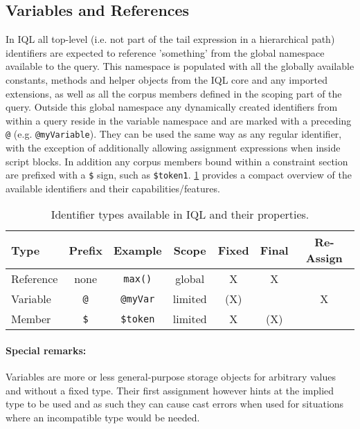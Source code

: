\documentclass[11pt,a4paper,portrait]{article}
\newcommand{\iql}{IQL\xspace}
\begin{document}
\subsection{Variables and References}
\label{sec:variables-references}

In \iql all top-level (i.e. not part of the tail expression in a hierarchical path) identifiers are expected to reference 'something' from the global namespace available to the query. This namespace is populated with all the globally available constants, methods and helper objects from the \iql core and any imported extensions, as well as all the corpus members defined in the scoping part of the query. Outside this global namespace any dynamically created identifiers from within a query reside in the variable namespace and are marked with a preceding \texttt{@} (e.g. \texttt{@myVariable}). They can be used the same way as any regular identifier, with the exception of additionally allowing assignment expressions when inside script blocks. In addition any corpus members bound within a constraint section are prefixed with a \texttt{\$} sign, such as \texttt{\$token1}. \cref{tab:identifiers} provides a compact overview of the available identifiers and their capabilities/features.

\begin{table}[ht]
	\centering\begin{tabular}{|l|c|c|c|c|c|c|}
		\hline 
		Type	& Prefix & Example & Scope & Fixed\footnotemark & Final & Re-Assign \\ 
		\hline 
		Reference	& none & \texttt{max()} & global & X & X &  \\ 
		\hline 
		Variable	& \texttt{@} & \texttt{@myVar} & limited & (X) &  & X \\ 
		\hline 
		Member	& \texttt{\$} & \texttt{\$token} & limited & X & (X) &  \\ 
		\hline 
	\end{tabular}
	\caption{Identifier types available in \iql and their properties.}
	\label{tab:identifiers}
\end{table}

\paragraph{Special remarks:}
\noindent Variables are more or less general-purpose storage objects for arbitrary values and without a fixed type. Their first assignment however hints at the implied type to be used and as such they can cause cast errors when used for situations where an incompatible type would be needed.
\end{document}
